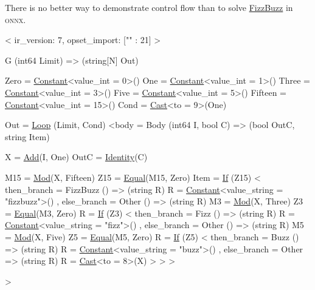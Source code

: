 \documentclass{article}
\begin{document}
There is no better way to demonstrate control flow than to solve \href{https://en.wikipedia.org/wiki/Fizz_buzz}{FizzBuzz} in \textsc{onnx}.

\begin{code}[linenumbers]
<
    ir_version: 7,
    opset_import: ["" : 21]
>

G (int64 Limit) => (string[N] Out) {
    Zero = \href{https://onnx.ai/onnx/operators/onnx__Constant.html}{Constant}<value_int = 0>()
    One = \href{https://onnx.ai/onnx/operators/onnx__Constant.html}{Constant}<value_int = 1>()
    Three = \href{https://onnx.ai/onnx/operators/onnx__Constant.html}{Constant}<value_int = 3>()
    Five = \href{https://onnx.ai/onnx/operators/onnx__Constant.html}{Constant}<value_int = 5>()
    Fifteen = \href{https://onnx.ai/onnx/operators/onnx__Constant.html}{Constant}<value_int = 15>()
    Cond = \href{https://onnx.ai/onnx/operators/onnx__Cast.html}{Cast}<to = 9>(One)

    Out = \href{https://onnx.ai/onnx/operators/onnx__Loop.html}{Loop} (Limit, Cond) <body = Body (int64 I, bool C) => (bool OutC, string Item) {
        X = \href{https://onnx.ai/onnx/operators/onnx__Add.html}{Add}(I, One)
        OutC = \href{https://onnx.ai/onnx/operators/onnx__Identity.html}{Identity}(C)

        M15 = \href{https://onnx.ai/onnx/operators/onnx__Mod.html}{Mod}(X, Fifteen)
        Z15 = \href{https://onnx.ai/onnx/operators/onnx__Equal.html}{Equal}(M15, Zero)
        Item = \href{https://onnx.ai/onnx/operators/onnx__If.html}{If} (Z15) <
            then_branch = FizzBuzz () => (string R) {
                R = \href{https://onnx.ai/onnx/operators/onnx__Constant.html}{Constant}<value_string = "fizzbuzz">()
            },
            else_branch = Other () => (string R) {
                M3 = \href{https://onnx.ai/onnx/operators/onnx__Mod.html}{Mod}(X, Three)
                Z3 = \href{https://onnx.ai/onnx/operators/onnx__Equal.html}{Equal}(M3, Zero)
                R = \href{https://onnx.ai/onnx/operators/onnx__If.html}{If} (Z3) <
                    then_branch = Fizz () => (string R) {
                        R = \href{https://onnx.ai/onnx/operators/onnx__Constant.html}{Constant}<value_string = "fizz">()
                    },
                    else_branch = Other () => (string R) {
                        M5 = \href{https://onnx.ai/onnx/operators/onnx__Mod.html}{Mod}(X, Five)
                        Z5 = \href{https://onnx.ai/onnx/operators/onnx__Equal.html}{Equal}(M5, Zero)
                        R = \href{https://onnx.ai/onnx/operators/onnx__If.html}{If} (Z5) <
                            then_branch = Buzz () => (string R) {
                                R = \href{https://onnx.ai/onnx/operators/onnx__Constant.html}{Constant}<value_string = "buzz">()
                            },
                            else_branch = Other => (string R) {
                                R = \href{https://onnx.ai/onnx/operators/onnx__Cast.html}{Cast}<to = 8>(X)
                            }
                        >
                    }
                >
            }
        >
    }>
}
\end{code}
\end{document}
